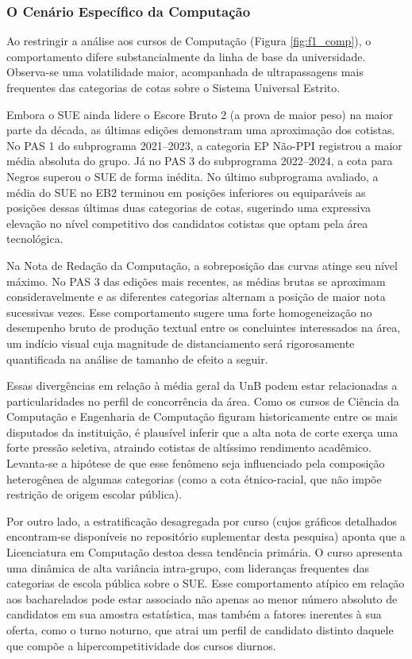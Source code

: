 \documentclass[12pt]{article}
\begin{document}
\subsubsection{O Cenário Específico da Computação}
Ao restringir a análise aos cursos de Computação (Figura \ref{fig:f1_comp}), o comportamento difere substancialmente da linha de base da universidade. Observa-se uma volatilidade maior, acompanhada de ultrapassagens mais frequentes das categorias de cotas sobre o Sistema Universal Estrito.

Embora o SUE ainda lidere o Escore Bruto 2 (a prova de maior peso) na maior parte da década, as últimas edições demonstram uma aproximação dos cotistas. No PAS 1 do subprograma 2021--2023, a categoria EP Não-PPI registrou a maior média absoluta do grupo. Já no PAS 3 do subprograma 2022--2024, a cota para Negros superou o SUE de forma inédita. No último subprograma avaliado, a média do SUE no EB2 terminou em posições inferiores ou equiparáveis as posições dessas últimas duas categorias de cotas, sugerindo uma expressiva elevação no nível competitivo dos candidatos cotistas que optam pela área tecnológica.

Na Nota de Redação da Computação, a sobreposição das curvas atinge seu nível máximo. No PAS 3 das edições mais recentes, as médias brutas se aproximam consideravelmente e as diferentes categorias alternam a posição de maior nota sucessivas vezes. Esse comportamento sugere uma forte homogeneização no desempenho bruto de produção textual entre os concluintes interessados na área, um indício visual cuja magnitude de distanciamento será rigorosamente quantificada na análise de tamanho de efeito a seguir.

Essas divergências em relação à média geral da UnB podem estar relacionadas a particularidades no perfil de concorrência da área. Como os cursos de Ciência da Computação e Engenharia de Computação figuram historicamente entre os mais disputados da instituição, é plausível inferir que a alta nota de corte exerça uma forte pressão seletiva, atraindo cotistas de altíssimo rendimento acadêmico. Levanta-se a hipótese de que esse fenômeno seja influenciado pela composição heterogênea de algumas categorias (como a cota étnico-racial, que não impõe restrição de origem escolar pública).

Por outro lado, a estratificação desagregada por curso (cujos gráficos detalhados encontram-se disponíveis no repositório suplementar desta pesquisa) aponta que a Licenciatura em Computação destoa dessa tendência primária. O curso apresenta uma dinâmica de alta variância intra-grupo, com lideranças frequentes das categorias de escola pública sobre o SUE. Esse comportamento atípico em relação aos bacharelados pode estar associado não apenas ao menor número absoluto de candidatos em sua amostra estatística, mas também a fatores inerentes à sua oferta, como o turno noturno, que atrai um perfil de candidato distinto daquele que compõe a hipercompetitividade dos cursos diurnos.
\end{document}
